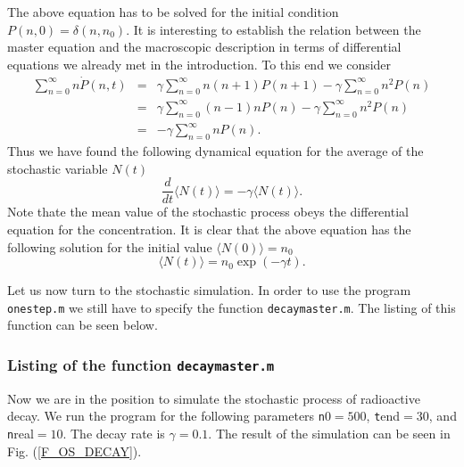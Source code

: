 The above equation has to be solved for the initial condition
$P(n,0)= \delta(n,n_0)$. 
It is interesting to establish the
relation between the master equation and the macroscopic 
description in terms of differential equations we already met in 
the introduction.
To this end we consider
\begin{eqnarray*}
\sum_{n=0}^{\infty} n \dot{P}(n,t) &=&
       \gamma \sum_{n=0}^{\infty} n(n+1)P(n+1) 
         - \gamma  \sum_{n=0}^{\infty} n^2 P(n) \\
  &=& \gamma \sum_{n=0}^{\infty} (n-1)n P(n) 
         - \gamma  \sum_{n=0}^{\infty} n^2 P(n) \\
  & = & - \gamma \sum_{n=0}^{\infty} n P(n) .
\end{eqnarray*}
Thus we have found the following dynamical equation for the 
average of the stochastic 
variable $N(t)$
\begin{equation}
\frac{d}{dt} \langle N(t) \rangle = - \gamma \langle N(t) \rangle.
\end{equation}
Note thate the mean value of the stochastic process obeys the 
differential equation for the concentration. It is clear that the 
above equation has the following solution for the initial value
$\langle N(0)\rangle = n_0$
\begin{equation*}
\langle N(t) \rangle = n_0 \exp(-\gamma t).
\end{equation*}

Let us now turn to the stochastic simulation. In order to use
the program \texttt{onestep.m} we still have to specify
the function \texttt{decaymaster.m}. The listing of this
function can be seen below.
\subsubsection{Listing of the function {\texttt{decaymaster.m}}}

Now we are in the position to simulate the stochastic process of
radioactive decay. We run the program for the following parameters
{\texttt n0}$=500$, {\texttt tend}$=30$, and {\texttt nreal}$=10$.
The decay rate is $\gamma=0.1$.
The result of the simulation can be seen in Fig. (\ref{F_OS_DECAY}).

